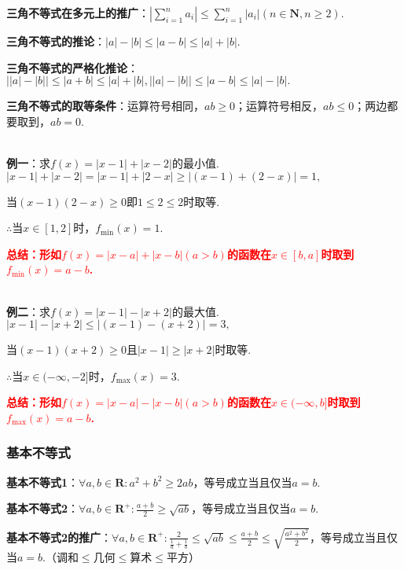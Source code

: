 \documentclass[8pt]{article}
\begin{document}
				\textbf{三角不等式在多元上的推广}：$\displaystyle \left|\sum_{i=1}^{n} a_i\right|\leq \sum_{i=1}^{n}|a_i| (n \in \mathbf{N}, n\geq 2).$

				\textbf{三角不等式的推论}：$|a|-|b|\leq |a-b| \leq |a|+|b|.$

				\textbf{三角不等式的严格化推论}：$\left||a|-|b|\right|\leq|a+b|\leq|a|+|b|, \left||a|-|b|\right|\leq|a-b|\leq|a|-|b|.$

				\textbf{三角不等式的取等条件}：运算符号相同，$ab\geq 0$；运算符号相反，$ab\leq 0$；两边都要取到，$ab=0$.

				~\\

				\textbf{例一}：求$f(x)=|x-1|+|x-2|$的最小值.
					~\\

					$|x-1|+|x-2|=|x-1|+|2-x|\geq|(x-1)+(2-x)|=1,$

					当$(x-1)(2-x)\geq 0$即$1\leq 2\leq 2$时取等.

					$\therefore$当$x\in[1, 2]$时，$f_{\min}(x)=1.$

					\textcolor{red}{\textbf{总结：形如$f(x)=|x-a|+|x-b| (a>b)$的函数在$x\in[b, a]$时取到$f_{\min}(x)=a-b$.}}

				~\\

				\textbf{例二}：求$f(x)=|x-1|-|x+2|$的最大值.
					~\\

					$|x-1|-|x+2|\leq|(x-1)-(x+2)|=3,$

					当$(x-1)(x+2)\geq 0$且$|x-1|\geq |x+2|$时取等.

					$\therefore$当$x\in(-\infty, -2]$时，$f_{\max}(x)=3.$

					\textcolor{red}{\textbf{总结：形如$f(x)=|x-a|-|x-b| (a>b)$的函数在$x\in(-\infty, b]$时取到$f_{\max}(x)=a-b$.}}

			\subsubsection{基本不等式}
				\textbf{基本不等式1}：$\forall a, b \in \mathbf{R}: a^2+b^2\geq 2ab$，等号成立当且仅当$a=b$.

				\textbf{基本不等式2}：$\displaystyle \forall a, b \in \mathbf{R}^{+}: \frac{a+b}{2}\geq \sqrt{ab}$，等号成立当且仅当$a=b$.

				\textbf{基本不等式2的推广}：$\displaystyle \forall a, b \in \mathbf{R}^{+}: \frac{2}{\frac{1}{a}+\frac{1}{b}}\leq\sqrt{ab}\leq\frac{a+b}{2}\leq\sqrt{\frac{a^2+b^2}{2}}$，等号成立当且仅当$a=b$.（调和$\leq$几何$\leq$算术$\leq$平方）
\end{document}
